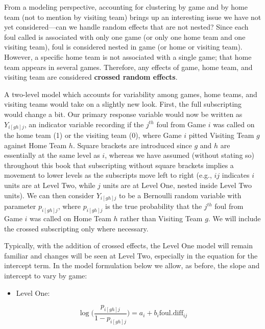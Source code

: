 \documentclass[
]{krantz}
\providecommand{\tightlist}{%
  \setlength{\itemsep}{0pt}\setlength{\parskip}{0pt}}
\begin{document}
From a modeling perspective, accounting for clustering by game and by home team (not to mention by visiting team) brings up an interesting issue we have not yet considered---can we handle random effects that are not nested? Since each foul called is associated with only one game (or only one home team and one visiting team), foul is considered nested in game (or home or visiting team). However, a specific home team is not associated with a single game; that home team appears in several games. Therefore, any effects of game, home team, and visiting team are considered \textbf{crossed random effects}. 

A two-level model which accounts for variability among games, home teams, and visiting teams would take on a slightly new look. First, the full subscripting would change a bit. Our primary response variable would now be written as \(Y_{i[gh]j}\), an indicator variable recording if the \(j^{th}\) foul from Game \(i\) was called on the home team (1) or the visiting team (0), where Game \(i\) pitted Visiting Team \(g\) against Home Team \(h\). Square brackets are introduced since \(g\) and \(h\) are essentially at the same level as \(i\), whereas we have assumed (without stating so) throughout this book that subscripting without square brackets implies a movement to lower levels as the subscripts move left to right (e.g., \(ij\) indicates \(i\) units are at Level Two, while \(j\) units are at Level One, nested inside Level Two units). We can then consider \(Y_{i[gh]j}\) to be a Bernoulli random variable with parameter \(p_{i[gh]j}\), where \(p_{i[gh]j}\) is the true probability that the \(j^{th}\) foul from Game \(i\) was called on Home Team \(h\) rather than Visiting Team \(g\). We will include the crossed subscripting only where necessary.

Typically, with the addition of crossed effects, the Level One model will remain familiar and changes will be seen at Level Two, especially in the equation for the intercept term. In the model formulation below we allow, as before, the slope and intercept to vary by game:

\begin{itemize}
\tightlist
\item
  Level One:
\end{itemize}

\begin{equation}
\log\bigg(\frac{p_{i[gh]j}}{1-p_{i[gh]j}}\bigg)=a_{i}+b_{i}\mathrm{foul.diff}_{ij}
\label{eq:lev1cross} 
\end{equation}
\end{document}
